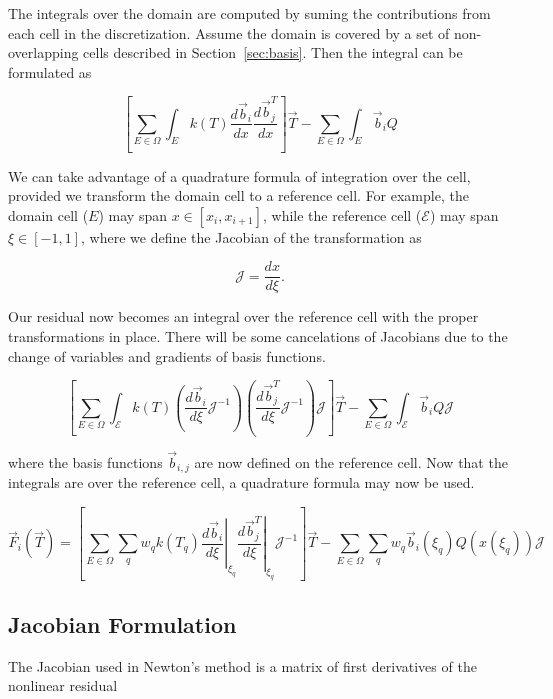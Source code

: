 \documentclass[11pt]{style/memo}
\begin{document}
\hspace{1em} The integrals over the domain are computed by suming the contributions from each cell in the
discretization. Assume the domain is covered by a set of non-overlapping cells described in 
Section~\ref{sec:basis}. Then the integral can be formulated as

\begin{equation*}
    \left[ \sum_{E\in\Omega} \int_E k(T) \frac{d\vec{b}_i}{dx} \frac{d\vec{b}_j^T}{dx} \right] \vec{T}
    - \sum_{E\in\Omega} \int_E \vec{b}_i Q
\end{equation*}

We can take advantage of a quadrature formula of integration over the cell, provided we transform
the domain cell to a reference cell. For example, the domain cell ($E$) may span ${x\in[x_i, x_{i+1}]}$,
while the reference cell ($\mathcal{E}$) may span ${\xi\in[-1,1]}$, where we define the Jacobian of the transformation
as

\begin{equation*}
    \mathcal{J} = \frac{dx}{d\xi}.
\end{equation*}

Our residual now becomes an integral over the reference cell with the proper transformations in place.
There will be some cancelations of Jacobians due to the change of variables and gradients of basis
functions.

\begin{equation*}
    \left[ \sum_{E\in\Omega} \int_\mathcal{E} k(T) 
        \left(\frac{d\vec{b}_i}{d\xi} \mathcal{J}^{-1} \right)
        \left(\frac{d\vec{b}_j^T}{d\xi} \mathcal{J}^{-1} \right) \mathcal{J} \right] \vec{T}
    - \sum_{E\in\Omega} \int_\mathcal{E} \vec{b}_i Q \mathcal{J}
\end{equation*}

where the basis functions $\vec{b}_{i,j}$ are now defined on the reference cell. Now that the integrals
are over the reference cell, a quadrature formula may now be used.

\begin{equation}
    \vec{F}_i(\vec{T}) = 
    \left[ \sum_{E\in\Omega} \sum_q w_q k(T_q) 
        \left. \frac{d\vec{b}_i}{d\xi} \right|_{\xi_q}
        \left. \frac{d\vec{b}_j^T}{d\xi} \right|_{\xi_q} \mathcal{J}^{-1} \right] \vec{T}
    - \sum_{E\in\Omega} \sum_q w_q \vec{b}_i(\xi_q) Q(x(\xi_q)) \mathcal{J}
\end{equation}

\subsection{Jacobian Formulation}
The Jacobian used in Newton's method is a matrix of first derivatives of the nonlinear residual
\end{document}
